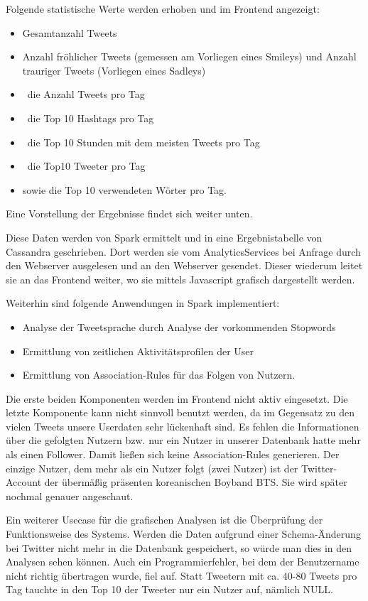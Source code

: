 Folgende statistische Werte werden erhoben und im Frontend angezeigt:

\begin{itemize}
\item Gesamtanzahl Tweets
\item Anzahl fröhlicher Tweets (gemessen am Vorliegen eines Smileys) und
Anzahl trauriger Tweets (Vorliegen eines Sadleys)
\item \ die Anzahl Tweets pro Tag
\item \ die Top 10 Hashtags pro Tag
\item \ die Top 10 Stunden mit dem meisten Tweets pro Tag
\item \ die Top10 Tweeter pro Tag
\item sowie die Top 10 verwendeten Wörter pro Tag.
\end{itemize}
Eine Vorstellung der Ergebnisse findet sich weiter unten.

Diese Daten werden von Spark ermittelt und in eine Ergebnistabelle von
Cassandra geschrieben. Dort werden sie vom AnalyticsServices bei
Anfrage durch den Webserver ausgelesen und an den Webserver gesendet.
Dieser wiederum leitet sie an das Frontend weiter, wo sie mittels
Javascript grafisch dargestellt werden.

Weiterhin sind folgende Anwendungen in Spark implementiert:

\begin{itemize}
\item Analyse der Tweetsprache durch Analyse der vorkommenden
Stopwords
\item Ermittlung von zeitlichen Aktivitätsprofilen der User
\item Ermittlung von Association-Rules für das Folgen von Nutzern.
\end{itemize}
Die erste beiden Komponenten werden im Frontend nicht aktiv eingesetzt.
Die letzte Komponente kann nicht sinnvoll benutzt werden, da im
Gegensatz zu den vielen Tweets unsere Userdaten sehr lückenhaft sind.
Es fehlen die Informationen über die gefolgten Nutzern bzw. nur ein
Nutzer in unserer Datenbank hatte mehr als einen Follower. Damit ließen
sich keine Association-Rules generieren. Der einzige Nutzer, dem mehr
als ein Nutzer folgt (zwei Nutzer) ist der Twitter-Account der
übermäßig präsenten koreanischen Boyband BTS. Sie wird später nochmal
genauer angeschaut.

Ein weiterer Usecase für die grafischen Analysen ist die Überprüfung der
Funktionsweise des Systems. Werden die Daten aufgrund einer
Schema-Änderung bei Twitter nicht mehr in die Datenbank gespeichert, so
würde man dies in den Analysen sehen können. Auch ein
Programmierfehler, bei dem der Benutzername nicht richtig übertragen
wurde, fiel auf. Statt Tweetern mit ca. 40-80 Tweets pro Tag tauchte in
den Top 10 der Tweeter nur ein Nutzer auf, nämlich NULL.

